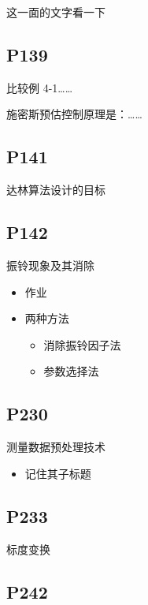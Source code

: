 \documentclass[zihao=-4
]{ctexart}%
\begin{document}
这一面的文字看一下

\hypertarget{header-n221}{%
\subsection{P139}\label{header-n221}}

比较例 4-1\ldots\ldots{}

施密斯预估控制原理是：\ldots\ldots{}

\hypertarget{header-n224}{%
\subsection{P141}\label{header-n224}}

达林算法设计的目标

\hypertarget{header-n226}{%
\subsection{P142}\label{header-n226}}

振铃现象及其消除

\begin{itemize}
\item
  作业
\item
  两种方法

  \begin{itemize}
  \item
    消除振铃因子法
  \item
    参数选择法
  \end{itemize}
\end{itemize}

\hypertarget{header-n238}{%
\subsection{P230}\label{header-n238}}

测量数据预处理技术

\begin{itemize}
\item
  记住其子标题
\end{itemize}

\hypertarget{header-n243}{%
\subsection{P233}\label{header-n243}}

标度变换

\hypertarget{header-n245}{%
\subsection{P242}\label{header-n245}}
\end{document}
